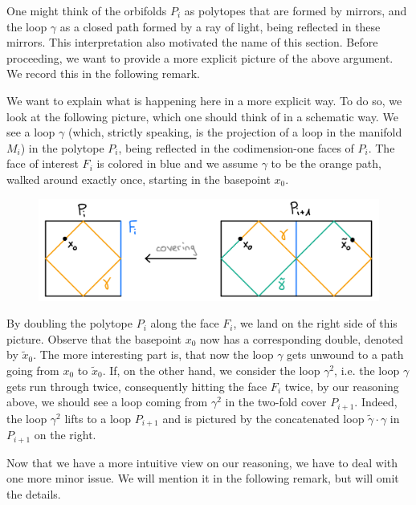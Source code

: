 One might think of the orbifolds \(P_i\) as polytopes that are formed by mirrors, and the loop \(\gamma\) as a closed path formed by a ray of light, being reflected in these mirrors.
This interpretation also motivated the name of this section.
Before proceeding, we want to provide a more explicit picture of the above argument.
We record this in the following remark.

\begin{remark}
    We want to explain what is happening here in a more explicit way.
    To do so, we look at the following picture, which one should think of in a schematic way.
    We see a loop \(\gamma\) (which, strictly speaking, is the projection of a loop in the manifold \(M_i\)) in the polytope \(P_i\), being reflected in the codimension-one faces of \(P_i\).
    The face of interest \(F_i\) is colored in blue and we assume \(\gamma\) to be the orange path, walked around exactly once, starting in the basepoint \(x_0\).
    \begin{figure}[ht!]
        \label{fig:ray}
        \centering
        \includegraphics[width=.8\textwidth]{gfx/Ray bouncing in P.png}
    \end{figure}\vspace*{-\parskip}\newpage

    \noindent
    By doubling the polytope \(P_i\) along the face \(F_i\), we land on the right side of this picture.
    Observe that the basepoint \(x_0\) now has a corresponding double, denoted by \(\widetilde{x}_0\).
    The more interesting part is, that now the loop \(\gamma\) gets unwound to a path going from \(x_0\) to \(\widetilde{x}_0\).
    If, on the other hand, we consider the loop \(\gamma^2\), i.e. the loop \(\gamma\) gets run through twice, consequently hitting the face \(F_i\) twice, by our reasoning above, we should see a loop coming from \(\gamma^2\) in the two-fold cover \(P_{i+1}\).
    Indeed, the loop \(\gamma^2\) lifts to a loop \(P_{i+1}\) and is pictured by the concatenated loop \(\widetilde{\gamma} \cdot \gamma\) in \(P_{i+1}\) on the right.
\end{remark}

Now that we have a more intuitive view on our reasoning, we have to deal with one more minor issue.
We will mention it in the following remark, but will omit the details.

